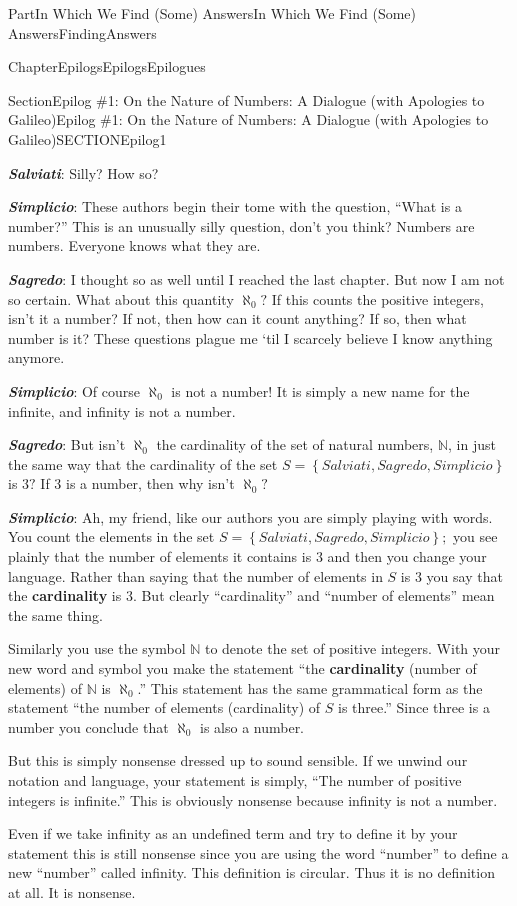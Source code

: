 \documentclass[oneside,10pt,]{book}
\newcommand{\alert}[1]{\textbf{\textit{#1}}}
\newcommand{\terminology}[1]{\textbf{#1}}
\numberwithin{equation}{part}
\newcommand{\NN}{\mathbb {N}}
\begin{document}
\begin{partptx}{Part}{In Which We Find (Some) Answers}{}{In Which We Find (Some) Answers}{}{}{FindingAnswers}
\begin{chapterptx}{Chapter}{Epilogs}{}{Epilogs}{}{}{Epilogues}
\begin{sectionptx}{Section}{Epilog \#1: On the Nature of Numbers: A Dialogue (with Apologies to Galileo)}{}{Epilog \#1: On the Nature of Numbers: A Dialogue (with Apologies to Galileo)}{}{}{SECTIONEpilog1}
\par
\alert{Salviati}: Silly? How so?%
\par
\alert{Simplicio}: These authors begin their tome with the question, ``What is a number?'' This is an unusually silly question, don't you think? Numbers are numbers. Everyone knows what they are.%
\par
\alert{Sagredo}: I thought so as well until I reached the last chapter.  But now I am not so certain.  What about this quantity \(\aleph_0?\) If this counts the positive integers, isn't it a number?  If not, then how can it count anything? If so, then what number is it?  These questions plague me `til I scarcely believe I know anything anymore.%
\par
\alert{Simplicio}: Of course \(\aleph_0\) is not a number! It is simply a new name for the infinite, and infinity is not a number.%
\par
\alert{Sagredo}: But isn't \(\aleph_0\) the cardinality of the set of natural numbers, \(\NN\), in just the same way that the cardinality of the set \(S=\left\{Salviati, Sagredo, Simplicio\right\}\) is \(3?\) If \(3\) is a number, then why isn't \(\aleph_0?\)%
\par
\alert{Simplicio}: Ah, my friend, like our authors you are simply playing with words. You count the elements in the set \(S=\left\{Salviati, Sagredo, Simplicio\right\};\) you see plainly that the number of elements it contains is \(3\) and then you change your language. Rather than saying that the number of elements in \(S\) is \(3\) you say that the \terminology{cardinality} is \(3\). But clearly ``cardinality'' and ``number of elements'' mean the same thing.%
\par
Similarly you use the symbol \(\NN\) to denote the set of positive integers. With your new word and symbol you make the statement ``the \terminology{cardinality} (number of elements) of \(\NN\) is \(\aleph_0\).'' This statement has the same grammatical form as the statement ``the number of elements (cardinality) of \(S\) is three.'' Since three is a number you conclude that \(\aleph_0\) is also a number.%
\par
But this is simply nonsense dressed up to sound sensible. If we unwind our notation and language, your statement is simply, ``The number of positive integers is infinite.'' This is obviously nonsense because infinity is not a number.%
\par
Even if we take infinity as an undefined term and try to define it by your statement this is still nonsense since you are using the word ``number'' to define a new ``number'' called infinity. This definition is circular. Thus it is no definition at all. It is nonsense.%

\end{sectionptx}
\end{chapterptx}
\end{partptx}
\end{document}
